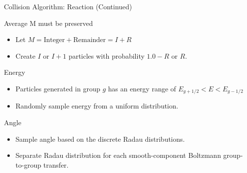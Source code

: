 \documentclass{beamer}
\begin{document}
\begin{frame}{Collision Algorithm: Reaction (Continued)}

Average M must be preserved

  \begin{itemize}
    \item Let $M =\text{Integer} + \text{Remainder} = I + R$
    
    \item  Create $I$ or $I+1$ particles with probability $1.0-R$ or $R$.
    
  \end{itemize}

Energy

  \begin{itemize}
    \item Particles generated in group $g$ has an energy range of $E_{g+1/2} < E< E_{g-1/2}$
    
    \item  Randomly sample energy from a uniform distribution.
    
  \end{itemize}

Angle

  \begin{itemize}
    \item Sample angle based on the discrete Radau distributions.
    
    \item  Separate Radau distribution for each smooth-component Boltzmann group-to-group transfer.
    
  \end{itemize}

\end{frame}
\end{document}
